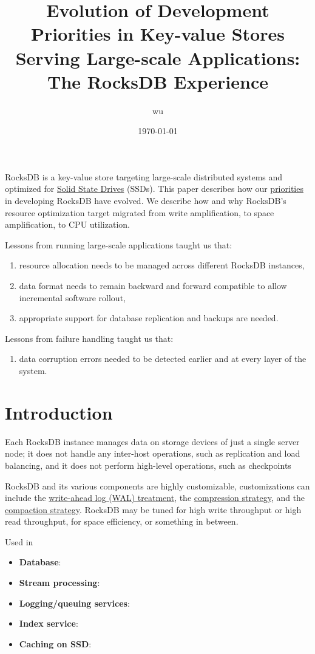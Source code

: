 \documentclass[11pt]{article}
\author{wu}
\date{\today}
\title{Evolution of Development Priorities in Key-value Stores Serving Large-scale Applications: The RocksDB Experience}
\begin{document}
\maketitle
RocksDB is a key-value store targeting large-scale distributed systems and optimized for \uline{Solid State Drives}
(SSDs). This paper describes how our \uline{priorities} in developing RocksDB have evolved. We describe how and why
RocksDB’s resource optimization target migrated from write amplification, to space amplification, to CPU
utilization.

Lessons from running large-scale applications taught us that:
\begin{enumerate}
\item resource allocation needs to be managed across different RocksDB instances,
\item data format needs to remain backward and forward compatible to allow incremental software rollout,
\item appropriate support for database replication and backups are needed.
\end{enumerate}

Lessons from failure handling taught us that:
\begin{enumerate}
\item data corruption errors needed to be detected earlier and at every layer of the system.
\end{enumerate}
\section{Introduction}
\label{sec:org350423d}
Each RocksDB instance manages data on storage devices of just a single server node; it does not handle
any inter-host operations, such as replication and load balancing, and it does not perform
high-level operations, such as checkpoints

RocksDB and its various components are highly customizable, customizations can include the
\uline{write-ahead log (WAL) treatment}, the \uline{compression strategy}, and the \uline{compaction strategy}. RocksDB may be
tuned for high write throughput or high read throughput, for space efficiency, or something in
between.


Used in
\begin{itemize}
\item \textbf{Database}:
\item \textbf{Stream processing}:
\item \textbf{Logging/queuing services}:
\item \textbf{Index service}:
\item \textbf{Caching on SSD}:
\end{itemize}
\end{document}

